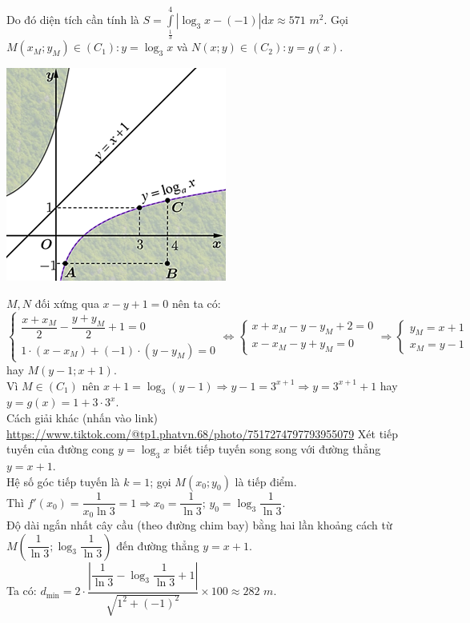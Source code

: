 \begin{ex}
{\begin{itemchoice}
			Do đó diện tích cần tính là $S = \int\limits_{\frac{1}{3}}^{4} |\log_3 x - (-1)| \mathrm{d} x \approx 571$ $m^2$.
			\itemch Gọi $M(x_M; y_M) \in (C_1): y = \log_3 x$ và $N(x; y) \in (C_2): y = g(x)$.
			\begin{center}
				\includegraphics[scale=.8]{img/HXN-5.14a}
			\end{center}
			$M, N$ đối xứng qua $x - y + 1 = 0$ nên ta có:\\
			$\begin{cases} \dfrac{x + x_M}{2} - \dfrac{y + y_M}{2} + 1 = 0 \\ 1 \cdot (x - x_M) + (-1) \cdot (y - y_M) = 0 \end{cases} \Leftrightarrow \begin{cases} x + x_M - y - y_M + 2 = 0 \\ x - x_M - y + y_M = 0 \end{cases} \Rightarrow \begin{cases} y_M = x+1 \\ x_M = y-1 \end{cases}$ hay $M(y-1; x+1)$.\\
			Vì $M \in (C_1)$ nên $x+1 = \log_3 (y-1) \Rightarrow y-1 = 3^{x+1} \Rightarrow y = 3^{x+1} + 1$ hay $y = g(x) = 1 + 3 \cdot 3^x$.\\
			Cách giải khác (nhấn vào link) \hyperlink{Cách giải khác(nhấn vào link)}{https://www.tiktok.com/@tp1.phatvn.68/photo/7517274797793955079}
			\itemch Xét tiếp tuyến của đường cong $y = \log_3 x$ biết tiếp tuyến song song với đường thẳng $y = x+1$.\\
			Hệ số góc tiếp tuyến là $k = 1$; gọi $M(x_0; y_0)$ là tiếp điểm.\\
			Thì $f'(x_0) = \dfrac{1}{x_0 \ln 3} = 1 \Rightarrow x_0 = \dfrac{1}{\ln 3}$; $y_0 = \log_3 \dfrac{1}{\ln 3}$.\\
			Độ dài ngắn nhất cây cầu (theo đường chim bay) bằng hai lần khoảng cách từ $M\left(\dfrac{1}{\ln 3}; \log_3 \dfrac{1}{\ln 3}\right)$ đến đường thẳng $y = x+1$.\\
			Ta có: $d_{\min} = 2 \cdot \dfrac{\left| \dfrac{1}{\ln 3} - \log_3 \dfrac{1}{\ln 3} + 1 \right|}{\sqrt{1^2 + (-1)^2}} \times 100 \approx 282$ $m$.
		\end{itemchoice}
	}
\end{ex}
